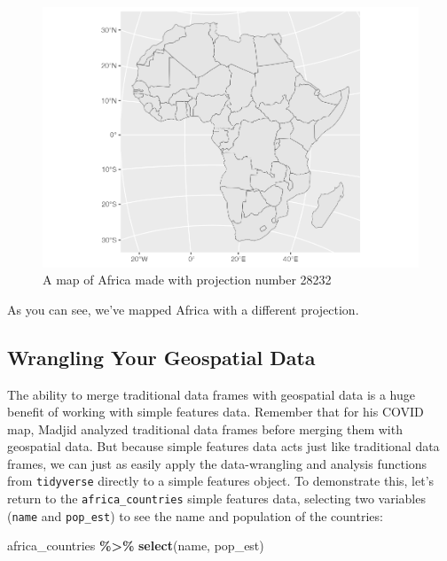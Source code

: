 \documentclass[
]{book}
\newenvironment{Shaded}{\begin{snugshade}}{\end{snugshade}}
\newcommand{\FunctionTok}[1]{\textcolor[rgb]{0.13,0.29,0.53}{\textbf{#1}}}
\newcommand{\NormalTok}[1]{#1}
\newcommand{\SpecialCharTok}[1]{\textcolor[rgb]{0.81,0.36,0.00}{\textbf{#1}}}
\begin{document}
\begin{figure}
\includegraphics[width=1\linewidth]{maps_files/figure-latex/africa-map-different-projection-1} \caption{A map of Africa made with projection number 28232}\label{fig:africa-map-different-projection}
\end{figure}

As you can see, we've mapped Africa with a different projection.

\hypertarget{wrangling-your-geospatial-data}{%
\subsection*{Wrangling Your Geospatial Data}\label{wrangling-your-geospatial-data}}

The ability to merge traditional data frames with geospatial data is a huge benefit of working with simple features data. Remember that for his COVID map, Madjid analyzed traditional data frames before merging them with geospatial data. But because simple features data acts just like traditional data frames, we can just as easily apply the data-wrangling and analysis functions from \texttt{tidyverse} directly to a simple features object. To demonstrate this, let's return to the \texttt{africa\_countries} simple features data, selecting two variables (\texttt{name} and \texttt{pop\_est}) to see the name and population of the countries:

\begin{Shaded}
\begin{Highlighting}[]
\NormalTok{africa\_countries }\SpecialCharTok{\%\textgreater{}\%}
  \FunctionTok{select}\NormalTok{(name, pop\_est)}
\end{Highlighting}
\end{Shaded}
\end{document}
